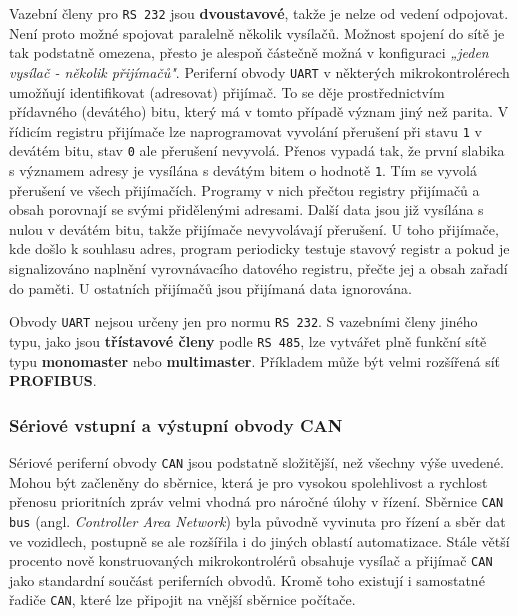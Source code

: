         Vazební členy pro \texttt{RS 232} jsou \textbf{dvoustavové}, takže je nelze od vedení 
        odpojovat. Není proto možné spojovat paralelně několik vysílačů. Možnost spojení do sítě je 
        tak podstatně omezena, přesto je alespoň částečně možná v konfiguraci \emph{„jeden vysílač 
        - několik přijímačů"}. Periferní obvody \texttt{UART} v některých mikrokontrolérech 
        umožňují identifikovat (adresovat) přijímač. To se děje prostřednictvím přídavného 
        (devátého) bitu, který má v tomto případě význam jiný než parita. V řídicím registru 
        přijímače lze naprogramovat vyvolání přerušení při stavu \texttt{1} v devátém bitu, 
        stav \texttt{0} ale přerušení nevyvolá. Přenos vypadá tak, že první slabika s významem 
        adresy je vysílána s devátým bitem o hodnotě \texttt{1}. Tím se vyvolá přerušení ve všech 
        přijímačích. Programy  v nich přečtou registry přijímačů a obsah porovnají se svými 
        přidělenými adresami. Další data jsou již vysílána s nulou v devátém bitu, takže přijímače 
        nevyvolávají přerušení. U toho přijímače, kde došlo k souhlasu adres, program 
        periodicky testuje stavový registr a pokud je signalizováno naplnění vyrovnávacího datového 
        registru, přečte jej a obsah zařadí do paměti. U ostatních přijímačů jsou přijímaná data 
        ignorována.
        
        Obvody \texttt{UART} nejsou určeny jen pro normu \texttt{RS 232}. S vazebními členy jiného 
        typu, jako jsou \textbf{třístavové členy} podle \texttt{RS 485}, lze vytvářet plně funkční 
        sítě typu \textbf{monomaster} nebo \textbf{multimaster}. Příkladem může být velmi rozšířená 
        síť \textbf{PROFIBUS}.       
        
      \subsubsection{Sériové vstupní a výstupní obvody CAN}
        Sériové periferní obvody \texttt{CAN} jsou podstatně složitější, než všechny výše uvedené. 
        Mohou být začleněny do sběrnice, která je pro vysokou spolehlivost a rychlost přenosu 
        prioritních zpráv velmi vhodná pro náročné úlohy v řízení. Sběrnice \texttt{CAN bus} (angl. 
        \emph{Controller Area Network}) byla původně vyvinuta pro řízení a sběr dat ve vozidlech, 
        postupně se ale rozšířila i do jiných oblastí automatizace. Stále větší procento nově 
        konstruovaných mikrokontrolérů obsahuje vysílač a přijímač \texttt{CAN} jako standardní 
        součást periferních obvodů. Kromě toho existují i samostatné řadiče \texttt{CAN}, které lze 
        připojit na vnější sběrnice počítače.
        
